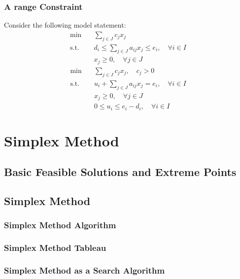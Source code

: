 \documentclass[10pt]{book}
\begin{document}
				\subsection{A range Constraint}
					Consider the following model statement:
					\begin{align}
						\min \quad & \sum_{j\in J}c_jx_j \nonumber\\
						\text{s.t.} \quad & d_i\le \sum_{j\in J}a_{ij}x_j \le e_i, \quad \forall i\in I \nonumber\\
						                  & x_j \ge 0, \quad \forall j\in J \nonumber
					\end{align}
					\begin{align}
						\min \quad & \sum_{j\in J}c_jx_j, \quad c_j > 0 \nonumber\\
						\text{s.t.} \quad & u_i + \sum_{j\in J}a_{ij}x_j = e_i, \quad \forall i\in I \nonumber\\
						                  & x_j \ge 0, \quad \forall j\in J \nonumber\\
						                  & 0\le u_i \le e_i-d_i, \quad \forall i\in I \nonumber
					\end{align}

		\chapter{Simplex Method}
			\section{Basic Feasible Solutions and Extreme Points}

			\section{Simplex Method}

				\subsection{Simplex Method Algorithm}

				\subsection{Simplex Method Tableau}

				\subsection{Simplex Method as a Search Algorithm}
\end{document}

